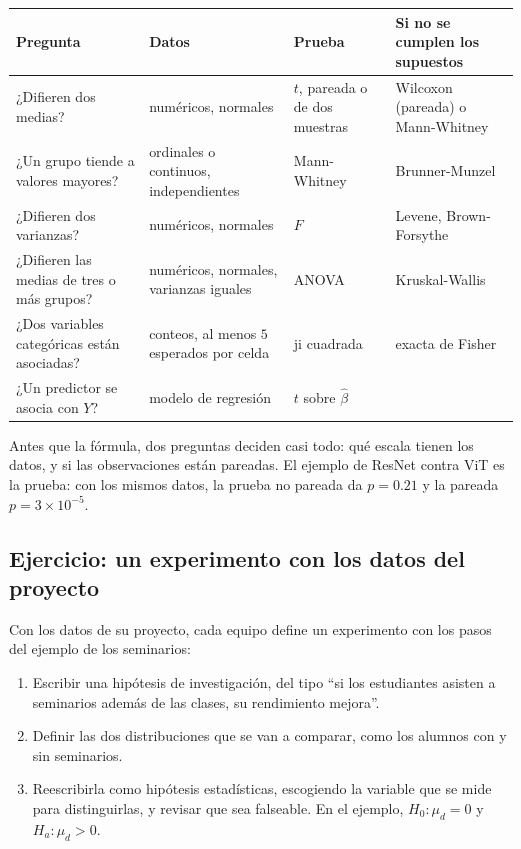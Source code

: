 \documentclass[11pt,letterpaper]{article}
\begin{document}
\begin{center}
\small
\begin{tabular}{>{\raggedright\arraybackslash}p{3.6cm}%
                >{\raggedright\arraybackslash}p{3.6cm}%
                >{\raggedright\arraybackslash}p{2.6cm}%
                >{\raggedright\arraybackslash}p{3.4cm}}
    \toprule
    \textbf{Pregunta} & \textbf{Datos} & \textbf{Prueba}
    & \textbf{Si no se cumplen los supuestos} \\
    \midrule
    ¿Difieren dos medias? & numéricos, normales
        & $t$, pareada o de dos muestras
        & Wilcoxon (pareada) o Mann-Whitney \\
    \addlinespace
    ¿Un grupo tiende a valores mayores? & ordinales o continuos,
        independientes & Mann-Whitney & Brunner-Munzel \\
    \addlinespace
    ¿Difieren dos varianzas? & numéricos, normales & $F$
        & Levene, Brown-Forsythe \\
    \addlinespace
    ¿Difieren las medias de tres o más grupos? & numéricos, normales,
        varianzas iguales & ANOVA & Kruskal-Wallis \\
    \addlinespace
    ¿Dos variables categóricas están asociadas? & conteos, al menos
        $5$ esperados por celda & ji cuadrada & exacta de Fisher \\
    \addlinespace
    ¿Un predictor se asocia con $Y$? & modelo de regresión
        & $t$ sobre $\hat{\beta}$ & \\
    \bottomrule
\end{tabular}
\end{center}

\begin{idea}
    Antes que la fórmula, dos preguntas deciden casi todo: qué escala
    tienen los datos, y si las observaciones están pareadas. El ejemplo
    de ResNet contra ViT es la prueba: con los mismos datos, la prueba
    no pareada da $p = 0.21$ y la pareada $p = 3 \times 10^{-5}$.
\end{idea}


\subsection*{Ejercicio: un experimento con los datos del proyecto}

Con los datos de su proyecto, cada equipo define un experimento con
los pasos del ejemplo de los seminarios:
\begin{enumerate}[itemsep=0.3em]
    \item Escribir una hipótesis de investigación, del tipo ``si los
          estudiantes asisten a seminarios además de las clases, su
          rendimiento mejora''.
    \item Definir las dos distribuciones que se van a comparar, como
          los alumnos con y sin seminarios.
    \item Reescribirla como hipótesis estadísticas, escogiendo la
          variable que se mide para distinguirlas, y revisar que sea
          falseable. En el ejemplo, $H_0\colon \mu_d = 0$ y
          $H_a\colon \mu_d > 0$.
\end{enumerate}
\end{document}
